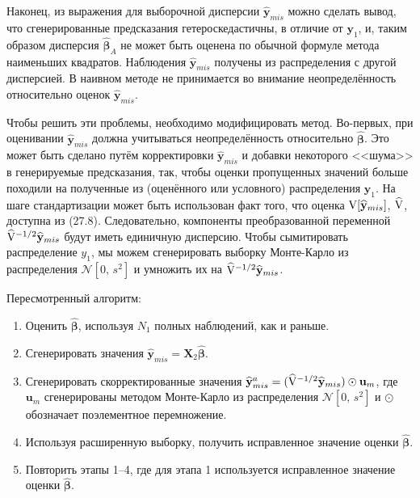 Наконец, из выражения для выборочной дисперсии $\widehat{\mathbf{y}}_{mis}$ можно сделать вывод, что сгенерированные предсказания гетероскедастичны, в отличие от $\mathbf{y}_1$, и, таким образом дисперсия $\widehat{\mathbf{\beta}}_A$ не может быть оценена по обычной формуле метода наименьших квадратов. Наблюдения $\widehat{\mathbf{y}}_{mis}$ получены из распределения с другой дисперсией. В наивном методе не принимается во внимание неопределённость относительно оценок $\widehat{\mathbf{y}}_{mis}$.

Чтобы решить эти проблемы, необходимо модифицировать метод. Во-первых, при оценивании $\widehat{\mathbf{y}}_{mis}$ должна учитываться неопределённость относительно $\widehat{\mathbf{\beta}}$. Это может быть сделано путём корректировки $\widehat{\mathbf{y}}_{mis}$ и добавки некоторого <<шума>> в генерируемые предсказания, так, чтобы оценки пропущенных значений больше походили на полученные из (оценённого или условного) распределения $\mathbf{y}_1$. На шаге стандартизации может быть использован факт того, что оценка $\mathrm{V}[\widehat{\mathbf{y}}_{mis}]$, $\widehat{\mathbf{\mathrm{V}}}$, доступна из (27.8). Следовательно, компоненты преобразованной переменной $\widehat{\mathbf{\mathrm{V}}}^{-1/2}\widehat{\mathbf{y}}_{mis}$ будут иметь единичную дисперсию. Чтобы сымитировать распределение $y_1$, мы можем сгенерировать выборку Монте-Карло из распределения $\mathcal{N}[0, \, s^2]$ и умножить их на $\widehat{\mathbf{\mathrm{V}}}^{-1/2}\widehat{\mathbf{y}}_{mis}$.

Пересмотренный алгоритм:
\begin{enumerate}
\item	Оценить $\widehat{\mathbf{\beta}}$, используя $N_1$ полных наблюдений, как и раньше.
\item	Сгенерировать значения $\widehat{\mathbf{y}}_{mis}=\mathbf{X}_2\widehat{\mathbf{\beta}}$.
\item	Сгенерировать скорректированные значения $\widehat{\mathbf{y}}_{mis}^a=(\widehat{\mathbf{\mathrm{V}}}^{-1/2}\widehat{\mathbf{y}}_{mis}) \odot \mathbf{u}_m$, где $\mathbf{u}_m$ сгенерированы  методом Монте-Карло из распределения $\mathcal{N}[0, \, s^2]$ и $\odot$ обозначает поэлементное перемножение.
\item	Используя расширенную выборку, получить исправленное значение оценки $\widehat{\mathbf{\beta}}$.
\item	Повторить этапы 1--4, где для этапа 1 используется исправленное значение оценки $\widehat{\mathbf{\beta}}$.
\end{enumerate}

